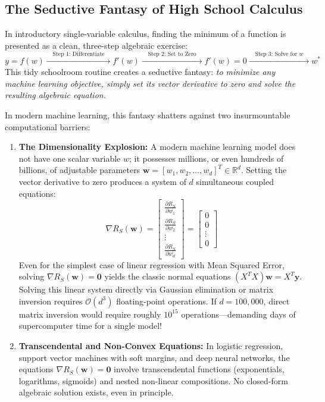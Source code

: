 \subsection{The Seductive Fantasy of High School Calculus}
In introductory single-variable calculus, finding the minimum of a function is presented as a clean, three-step algebraic exercise:
\begin{equation}
y = f(w) \xrightarrow{\quad\text{Step 1: Differentiate}\quad} f'(w) \xrightarrow{\quad\text{Step 2: Set to Zero}\quad} f'(w) = 0 \xrightarrow{\quad\text{Step 3: Solve for } w\quad} w^*
\end{equation}
This tidy schoolroom routine creates a seductive fantasy: \emph{to minimize any machine learning objective, simply set its vector derivative to zero and solve the resulting algebraic equation.}

In modern machine learning, this fantasy shatters against two insurmountable computational barriers:
\begin{enumerate}
    \item \textbf{The Dimensionality Explosion:} A modern machine learning model does not have one scalar variable $w$; it possesses millions, or even hundreds of billions, of adjustable parameters $\mathbf{w} = [w_1, w_2, \dots, w_d]^T \in \mathbb{R}^d$. Setting the vector derivative to zero produces a system of $d$ simultaneous coupled equations:
    \begin{equation}
    \nabla R_S(\mathbf{w}) = \begin{bmatrix} \frac{\partial R_S}{\partial w_1} \\ \frac{\partial R_S}{\partial w_2} \\ \vdots \\ \frac{\partial R_S}{\partial w_d} \end{bmatrix} = \begin{bmatrix} 0 \\ 0 \\ \vdots \\ 0 \end{bmatrix}
    \end{equation}
    Even for the simplest case of linear regression with Mean Squared Error, solving $\nabla R_S(\mathbf{w}) = \mathbf{0}$ yields the classic normal equations $(X^T X)\mathbf{w} = X^T \mathbf{y}$. Solving this linear system directly via Gaussian elimination or matrix inversion requires $\mathcal{O}(d^3)$ floating-point operations. If $d = 100{,}000$, direct matrix inversion would require roughly $10^{15}$ operations—demanding days of supercomputer time for a single model!
    
    \item \textbf{Transcendental and Non-Convex Equations:} In logistic regression, support vector machines with soft margins, and deep neural networks, the equations $\nabla R_S(\mathbf{w}) = \mathbf{0}$ involve transcendental functions (exponentials, logarithms, sigmoids) and nested non-linear compositions. No closed-form algebraic solution exists, even in principle.
\end{enumerate}

